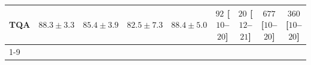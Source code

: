 \begin{tabular}{l|cccc|cccc|}
TQA & {\cellcolor[HTML]{04649D}} \color[HTML]{F1F1F1} $88.3\pm 3.3$ & {\cellcolor[HTML]{056FAE}} \color[HTML]{F1F1F1} $85.4\pm 3.9$ & {\cellcolor[HTML]{1B7EB7}} \color[HTML]{F1F1F1} $82.5\pm 7.3$ & {\cellcolor[HTML]{04639B}} \color[HTML]{F1F1F1} $88.4\pm 5.0$ & {\cellcolor[HTML]{FDE3E0}} \color[HTML]{000000} $92$ [$10$--$20$] & {\cellcolor[HTML]{FFF4F0}} \color[HTML]{000000} $20$ [$12$--$21$] & {\cellcolor[HTML]{7D0177}} \color[HTML]{F1F1F1} $677$ [$10$--$20$] & {\cellcolor[HTML]{F87CA8}} \color[HTML]{F1F1F1} $360$ [$10$--$20$] \\
\cline{1-9}
\bottomrule
\end{tabular}
